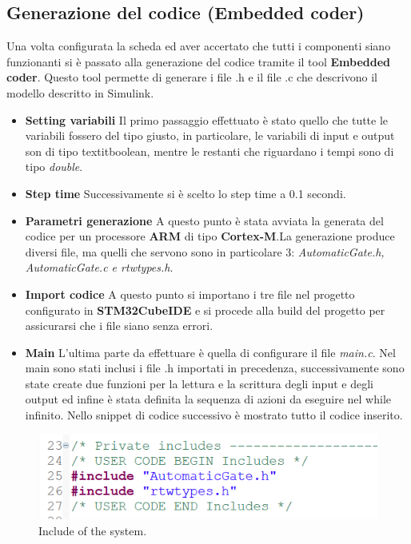 \documentclass[12pt]{article}
\begin{document}
\newpage
\subsection{Generazione del codice (Embedded coder)}

Una volta configurata la scheda ed aver accertato che tutti i componenti siano funzionanti si è passato alla generazione del codice tramite il tool \textbf{Embedded coder}. Questo tool permette di generare i file .h e il file .c che descrivono il modello descritto in Simulink.
\begin{itemize}
    \item {\textbf{Setting variabili}} Il primo passaggio effettuato è stato quello che tutte le variabili fossero del tipo giusto, in particolare, le variabili di input e output son di tipo textit{boolean}, mentre le restanti che riguardano i tempi sono di tipo \textit{double}.
    \item {\textbf{Step time}} Successivamente si è scelto lo step time a 0.1 secondi.
    \item {\textbf{Parametri generazione}} A questo punto è stata avviata la generata del codice per un processore \textbf{ARM} di tipo \textbf{Cortex-M}.La generazione produce diversi file, ma quelli che servono sono in particolare 3: \textit{AutomaticGate.h, AutomaticGate.c e rtwtypes.h}.
    \item {\textbf{Import codice}} A questo punto si importano i tre file nel progetto configurato in \textbf{STM32CubeIDE} e si procede alla build del progetto per assicurarsi che i file siano senza errori.
    \item {\textbf{Main}} L'ultima parte da effettuare è quella di configurare il file \textit{main.c}. Nel main sono stati inclusi i file .h importati in precedenza, successivamente sono state create due funzioni per la lettura e la scrittura degli input e degli output ed infine è stata definita la sequenza di azioni da eseguire nel while infinito. Nello snippet di codice successivo è mostrato tutto il codice inserito.
\end{itemize}
\begin{figure}[H]
    \centering
    \includegraphics[width=1\textwidth]{snippet/include.png}
    \caption{Include of the system.}
\end{figure}
\end{document}
